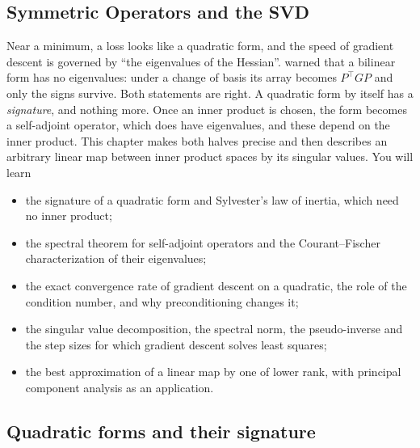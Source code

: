 \begin{notechapter}
\chapter{Symmetric Operators and the SVD}
\label{ch:spectral-svd}

\begin{chapterintro}
Near a minimum, a loss looks like a quadratic form, and the speed of
gradient descent is governed by ``the eigenvalues of the Hessian''.
 warned that a bilinear form has no eigenvalues: under a
change of basis its array becomes $P^\top GP$ and only the signs survive.
Both statements are right. A quadratic form by itself has a
\emph{signature}, and nothing more. Once an inner product is chosen, the
form becomes a self-adjoint operator, which does have eigenvalues, and
these depend on the inner product. This chapter makes both halves precise
and then describes an arbitrary linear map between inner product spaces by
its singular values. You will learn
\begin{itemize}[nosep]
  \item the signature of a quadratic form and Sylvester's law of inertia,
        which need no inner product;
  \item the spectral theorem for self-adjoint operators and the
        Courant--Fischer characterization of their eigenvalues;
  \item the exact convergence rate of gradient descent on a quadratic, the
        role of the condition number, and why preconditioning changes it;
  \item the singular value decomposition, the spectral norm, the
        pseudo-inverse and the step sizes for which gradient descent
        solves least squares;
  \item the best approximation of a linear map by one of lower rank, with
        principal component analysis as an application.
\end{itemize}
\end{chapterintro}

\section{Quadratic forms and their signature}
\label{spectral-svd:sec:signature}


\end{notechapter}
